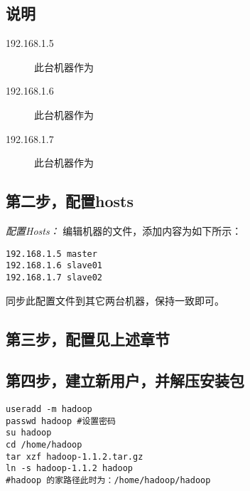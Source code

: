 \documentclass{article}
\begin{document}
\subsection{说明}
\begin{description}
\item[192.168.1.5] 此台机器作为
\item[192.168.1.6] 此台机器作为
\item[192.168.1.7] 此台机器作为
\end{description}

\subsection{第二步，配置hosts}
\textit{配置Hosts：}
编辑机器的文件，添加内容为如下所示：

\begin{verbatim}
192.168.1.5 master
192.168.1.6 slave01
192.168.1.7 slave02
\end{verbatim}

同步此配置文件到其它两台机器，保持一致即可。

\subsection{第三步，配置见上述章节}

\subsection{第四步，建立新用户，并解压安装包}
\begin{verbatim}
useradd -m hadoop
passwd hadoop #设置密码
su hadoop
cd /home/hadoop
tar xzf hadoop-1.1.2.tar.gz 
ln -s hadoop-1.1.2 hadoop
#hadoop 的家路径此时为：/home/hadoop/hadoop
\end{verbatim}
\end{document}
